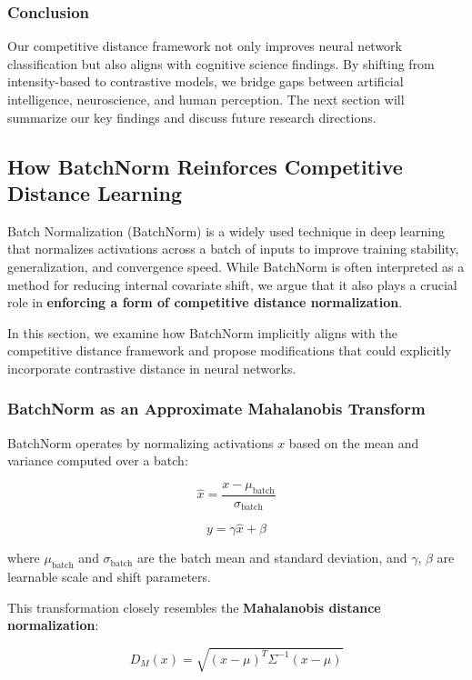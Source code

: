 \documentclass[12pt]{article}
\begin{document}
\subsubsection{Conclusion}

Our competitive distance framework not only improves neural network classification but also aligns with cognitive science findings. By shifting from intensity-based to contrastive models, we bridge gaps between artificial intelligence, neuroscience, and human perception. The next section will summarize our key findings and discuss future research directions.

\subsection{How BatchNorm Reinforces Competitive Distance Learning}

Batch Normalization (BatchNorm) is a widely used technique in deep learning that normalizes activations across a batch of inputs to improve training stability, generalization, and convergence speed. While BatchNorm is often interpreted as a method for reducing internal covariate shift, we argue that it also plays a crucial role in \textbf{enforcing a form of competitive distance normalization}. 

In this section, we examine how BatchNorm implicitly aligns with the competitive distance framework and propose modifications that could explicitly incorporate contrastive distance in neural networks.

\subsubsection{BatchNorm as an Approximate Mahalanobis Transform}

BatchNorm operates by normalizing activations \( x \) based on the mean and variance computed over a batch:

\[
\hat{x} = \frac{x - \mu_{\text{batch}}}{\sigma_{\text{batch}}}
\]

\[
y = \gamma \hat{x} + \beta
\]

where \( \mu_{\text{batch}} \) and \( \sigma_{\text{batch}} \) are the batch mean and standard deviation, and \( \gamma \), \( \beta \) are learnable scale and shift parameters.

This transformation closely resembles the \textbf{Mahalanobis distance normalization}:

\[
D_M(x) = \sqrt{(x - \mu)^T \Sigma^{-1} (x - \mu)}
\]
\end{document}
